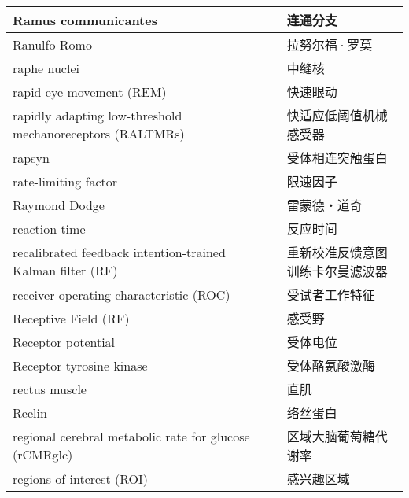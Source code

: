 \begin{longtable}{lll}
	\midrule
	Ramus communicantes   && 连通分支  \\
	
	\midrule
	Ranulfo Romo   && 拉努尔福·罗莫  \\
	
	\midrule
	raphe nuclei   && 中缝核  \\
	
	\midrule
	rapid eye movement (REM)   && 快速眼动  \\
	
	\midrule
	\makecell[l]{rapidly adapting low-threshold\\ mechanoreceptors (RALTMRs)}  && 快适应低阈值机械感受器  \\
	
	\midrule
	rapsyn  && 受体相连突触蛋白  \\
	
	\midrule
	rate-limiting factor  && 限速因子  \\
	
	\midrule
	Raymond Dodge  && 雷蒙德・道奇  \\
	
	\midrule
	reaction time  && 反应时间  \\
	
	\midrule
	\makecell[l]{recalibrated feedback intention-trained\\ Kalman filter (RF)}   && \makecell[l]{重新校准反馈意图\\训练卡尔曼滤波器}  \\
	
	\midrule
	receiver operating characteristic (ROC)   && 受试者工作特征  \\
	
	\midrule
	Receptive Field (RF)   && 感受野  \\
	
	\midrule
	Receptor potential   && 受体电位  \\
	
	\midrule
	Receptor tyrosine kinase   && 受体酪氨酸激酶  \\
	
	\midrule
	rectus muscle   && 直肌  \\
	
	\midrule
	Reelin   && 络丝蛋白  \\
	
	\midrule
	regional cerebral metabolic rate for glucose (rCMRglc)  && 区域大脑葡萄糖代谢率  \\
	
	\midrule
	regions of interest (ROI)   && 感兴趣区域  \\
	

\end{longtable}
